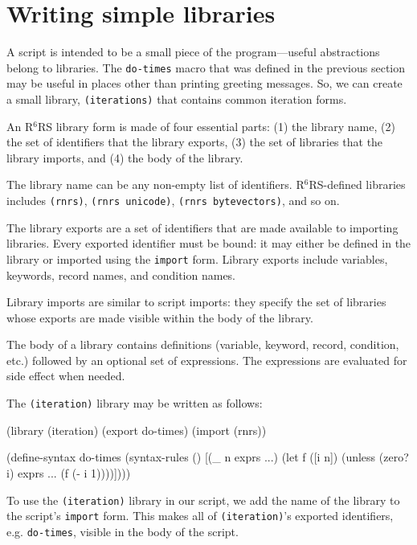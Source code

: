 \documentclass[onecolumn, 12pt, twoside, openright, dvipdfm]{book}
\newcommand{\rnrs}[1]{R$^{\mathrm{#1}}$RS}
\begin{document}
\section{Writing simple libraries}

A script is intended to be a small piece of the program---useful
abstractions belong to libraries.  The \texttt{do-times} macro that
was defined in the previous section may be useful in places other
than printing greeting messages.  So, we can create a small library,
\texttt{(iterations)} that contains common iteration forms.  

An \rnrs{6} library form is made of four essential parts: (1) the
library name, (2) the set of identifiers that the library exports,
(3) the set of libraries that the library imports, and (4) the body
of the library.  


The library name can be any non-empty list of identifiers.
\rnrs{6}-defined libraries includes \texttt{(rnrs)},
\texttt{(rnrs~unicode)}, \texttt{(rnrs~bytevectors)}, and so on.

The library exports are a set of identifiers that are made available
to importing libraries.  Every exported identifier must be bound: it
may either be defined in the library or imported using the
\texttt{import} form.  Library exports include variables, keywords,
record names, and condition names.

Library imports are similar to script imports: they specify the set
of libraries whose exports are made visible within the body of the
library.  

The body of a library contains definitions (variable, keyword,
record, condition, etc.) followed by an optional set of expressions.
The expressions are evaluated for side effect when needed.


The \texttt{(iteration)} library may be written as follows:

\begin{CodeInline}
(library (iteration)
  (export do-times)
  (import (rnrs))

  (define-syntax do-times
    (syntax-rules ()
      [(_ n exprs ...)
       (let f ([i n])
         (unless (zero? i)
           exprs ...
           (f (- i 1))))])))
\end{CodeInline}

To use the \texttt{(iteration)} library in our script, we add the
name of the library to the script's \texttt{import} form.  This
makes all of \texttt{(iteration)}'s exported identifiers, e.g.
\texttt{do-times},  visible in the body of the script.
\end{document}
